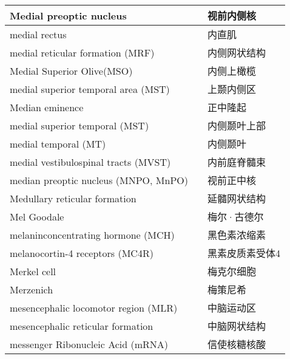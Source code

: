\begin{longtable}{lll}
	\midrule
	Medial preoptic nucleus    && 视前内侧核  \\
	
	\midrule
	medial rectus    && 内直肌  \\
	
	\midrule
	medial reticular formation (MRF)    && 内侧网状结构  \\
	
	\midrule
	Medial Superior Olive(MSO)   && 内侧上橄榄  \\
	
	\midrule
	medial superior temporal area (MST)   && 上颞内侧区  \\
	
	\midrule
	Median eminence   && 正中隆起  \\
	
	\midrule
	medial superior temporal (MST)   && 内侧颞叶上部  \\
	
	\midrule
	medial temporal (MT)   && 内侧颞叶  \\
	
	\midrule
	medial vestibulospinal tracts (MVST) && 内前庭脊髓束  \\
	
	\midrule
	median preoptic nucleus (MNPO, MnPO) && 视前正中核  \\
	
	\midrule
	Medullary reticular formation && 延髓网状结构  \\
	
	\midrule
	Mel Goodale && 梅尔·古德尔  \\
	
	\midrule
	melaninconcentrating hormone (MCH) && 黑色素浓缩素  \\
	
	\midrule
	melanocortin-4 receptors (MC4R) && 黑素皮质素受体4  \\
	
	\midrule
	Merkel cell && 梅克尔细胞  \\
	
	\midrule
	Merzenich && 梅策尼希  \\
	
	\midrule
	mesencephalic locomotor region (MLR)   && 中脑运动区  \\
	
	\midrule
	mesencephalic reticular formation   && 中脑网状结构  \\
	
	\midrule
	messenger Ribonucleic Acid (mRNA)   && 信使核糖核酸  \\
	

\end{longtable}
